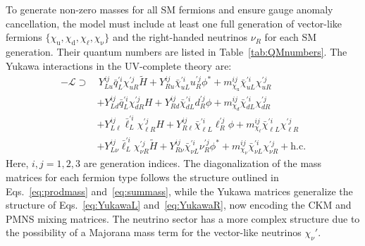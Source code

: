 To generate non-zero masses for all SM fermions and ensure gauge anomaly cancellation, the model must include at least one full generation of vector-like fermions $\{\chi_\mathrm{u}, \chi_\mathrm{d}, \chi_\mathrm{\ell}, \chi_\mathrm{\nu}\}$ and the right-handed neutrinos $\nu_R$ for each SM generation. Their quantum numbers are listed in Table~\ref{tab:QMnumbers}. The Yukawa interactions in the UV-complete theory are:
\begin{equation}
    \begin{aligned}
        -\mathcal{L} \supset&\,
        Y_{L u}^{ij} \bar{q}_L^{\prime i} \chi_{u R}^{\prime j} \widetilde{H}
        + Y_{R u}^{ij} \bar{\chi}_{u L}^{\prime i} u_R^{\prime j} \phi^*
        + m_{\chi_\mathrm{u}}^{ij} \bar{\chi}_{u L}^{\prime i} \chi_{u R}^{\prime j} \\
        &+ Y_{L d}^{ij} \bar{q}_L^{\prime i} \chi_{d R}^{\prime j} H
        + Y_{R d}^{ij} \bar{\chi}_{d L}^{\prime i} d_R^{\prime j} \phi
        + m_{\chi_d}^{ij} \bar{\chi}_{d L}^{\prime i} \chi_{d R}^{\prime j} \\
        &+ Y_{L \ell}^{ij} \bar{\ell}_L^{\prime i} \chi_{\ell R}^{\prime j} H
        + Y_{R \ell}^{ij} \bar{\chi}_{\ell L}^{\prime i} \ell_R^{\prime j} \phi
        + m_{\chi_\ell}^{ij} \bar{\chi}_{\ell L}^{\prime i} \chi_{\ell R}^{\prime j} \\
        &+ Y_{L \nu}^{ij} \bar{\ell}_L^{\prime i} \chi_{\nu R}^{\prime j} \widetilde{H}
        + Y_{R \nu}^{ij} \bar{\chi}_{\nu L}^{\prime i} \nu_R^{\prime j} \phi^*
        + m_{\chi_\nu}^{ij} \bar{\chi}_{\nu L}^{\prime i} \chi_{\nu R}^{\prime j}
        + \text{h.c.}
    \end{aligned}
\end{equation}
Here, $i, j = 1,2,3$ are generation indices. The diagonalization of the mass matrices for each fermion type follows the structure outlined in Eqs.~\eqref{eq:prodmass} and~\eqref{eq:summass}, while the Yukawa matrices generalize the structure of Eqs.~\eqref{eq:YukawaL} and~\eqref{eq:YukawaR}, now encoding the CKM and PMNS mixing matrices. The neutrino sector has a more complex structure due to the possibility of a Majorana mass term for the vector-like neutrinos $\chi_\nu'$.